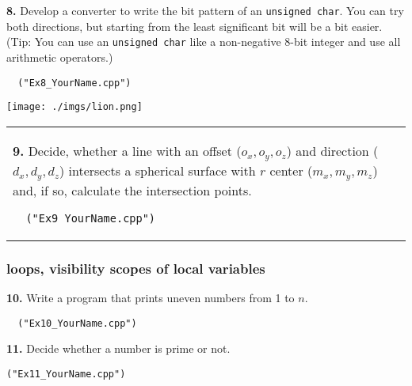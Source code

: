 \documentclass[paper=A4, pagesize, DIV=calc, smallheadings,
fontsize=11pt, expansion=false]{scrreprt}
\begin{document}
\textbf{8.} 
Develop a converter to write the bit pattern of an \texttt{unsigned char}.
You can try both directions, but starting from the least significant bit will be a bit easier.\\
(Tip: You can use an \texttt{unsigned char} like a non-negative 8-bit integer and use all arithmetic
operators.)
\begin{verbatim}
  ("Ex8_YourName.cpp")
\end{verbatim}



\begin{minipage}[H]{0.3\linewidth}
\texttt{[image: ./imgs/lion.png]}
\end{minipage}
\begin{tabular}{m{30em}}
\textbf{9.} 
Decide, whether a line with an offset ($o_x, o_y, o_z$) and direction ($d_x, d_y, d_z$) intersects a spherical surface
with $r$ center ($m_x, m_y, m_z$) and, if so, calculate the intersection points.
\begin{verbatim}
  ("Ex9_YourName.cpp") 
\end{verbatim}
\end{tabular}



\subsubsection*{loops, visibility scopes of local variables} 
\textbf{10.} Write a program that prints uneven numbers from 1 to $n$.
\begin{verbatim}
  ("Ex10_YourName.cpp")
\end{verbatim}



\textbf{11.} Decide whether a number is prime or not.
\begin{verbatim}
("Ex11_YourName.cpp")
\end{verbatim}
\end{document}
